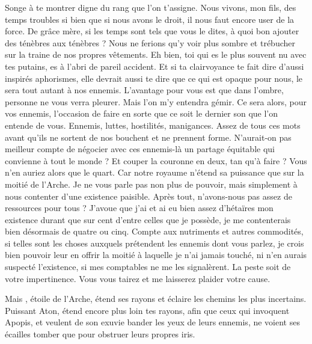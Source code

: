 \scene

\StageDirII{\reine, \vladimir}



\begin{drama}
  \reinespeaks    Songe à te montrer digne du rang que l’on t’assigne. Nous vivons, mon fils, des temps troubles si bien que si nous avons le droit, il nous faut encore user de la force.
  \vladimirspeaks De grâce mère, si les temps sont tels que vous le dites, à quoi bon ajouter des ténèbres aux ténèbres ? Nous ne ferions qu’y voir plus sombre et trébucher sur la traine de nos propres vêtements.
  \reinespeaks    Eh bien, toi qui es le plus souvent nu avec tes putains, es à l’abri de pareil accident. Et si ta clairvoyance te fait dire d’aussi inspirés aphorismes, elle devrait aussi te dire que ce qui est opaque pour nous, le sera tout autant à nos ennemis. L’avantage pour vous est que dans l’ombre, personne ne vous verra pleurer.
  \vladimirspeaks Mais l’on m’y entendra gémir.
  \reinespeaks Ce sera alors, pour vos ennemis, l’occasion de faire en sorte que ce soit le dernier son que l’on entende de vous.
  \vladimirspeaks Ennemis, luttes, hostilités, manigances. Assez de tous ces mots avant qu’ils ne sortent de nos bouchent et ne prennent forme. N’aurait-on pas meilleur compte de négocier avec ces ennemis-là un partage équitable qui convienne à tout le monde ?
  \reinespeaks Et couper la  couronne en deux, tan qu’à faire ? Vous n’en auriez alors que le quart. Car notre royaume n’étend sa puissance que sur la moitié de l’Arche.
  \vladimirspeaks Je ne vous parle pas non plus de pouvoir, mais simplement à nous contenter d’une existence paisible. Après tout, n’avons-nous pas assez de ressources pour tous ? J’avoue que j’ai et ai eu bien assez d’hétaïres mon existence durant que sur cent d’entre celles que je possède, je me contenterais bien désormais de quatre ou cinq. Compte aux nutriments et autres commodités, si telles sont les choses auxquels prétendent les ennemis dont vous parlez, je crois bien pouvoir leur en offrir la moitié à laquelle je n’ai jamais touché, ni n’en aurais suspecté l’existence, si mes comptables ne me les signalèrent.
  \reinespeaks La peste soit de votre impertinence. Vous vous tairez et me laisserez plaider votre cause.

  \choirspeaks Mais \elena, étoile de l’Arche, étend ses rayons et éclaire les chemins les plus incertains. Puissant Aton, étend encore plus loin tes rayons, afin que ceux qui invoquent Apopis, et veulent de son exuvie bander les yeux de leurs ennemis, ne voient ses écailles tomber que pour obstruer leurs propres iris.

\end{drama}



